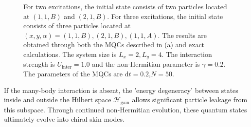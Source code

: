 \documentclass[longbibliography, aps, prx, amsmath, amssymb, amsfonts, twocolumn,superscriptaddress, footinbib]{revtex4-1}
\begin{document}
\begin{figure}[htbp]
{		%
		For two excitations, the initial state consists of two particles located at $(1,1,B)$ and $(2,1,B)$. For three excitations, the initial state consists of three particles located at $(x,y,\alpha)=(1,1,B), (2,1,B), (1,1,A)$.
		The results are obtained through both the MQCs described in (a) and exact calculations. The system size is $L_x=2,L_y=4$. The interaction strength is $U_{\text{inter}}=1.0$ and the non-Hermitian parameter is $\gamma=0.2$. The parameters of the MQCs are $\mathrm{d}t=0.2$,$N=50$.
		}
		\label{fig:04}
	\end{figure}
    
    If the many-body interaction is absent, the 'energy degeneracy' between states inside and outside the Hilbert space $\mathscr{H}_{\text{gain}}$ allows significant particle leakage from this subspace.
	Through continued non-Hermitian evolution, these quantum states ultimately evolve into chiral skin modes.
\end{document}
